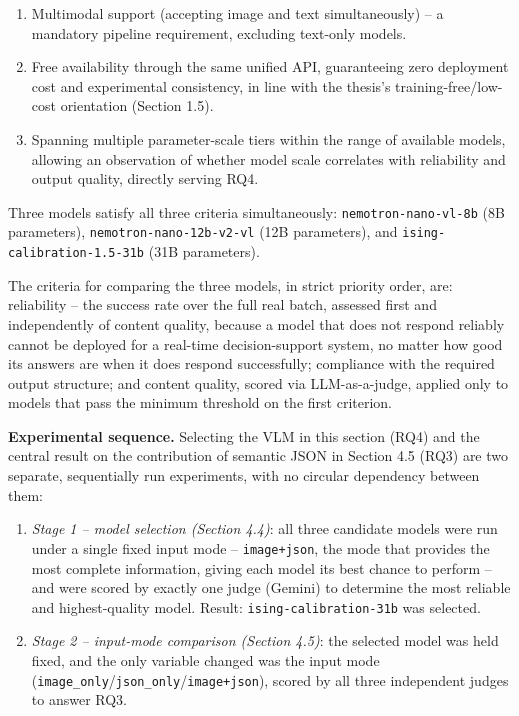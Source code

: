 \documentclass[12pt,a4paper]{report}
\begin{document}
\begin{enumerate}
    \item Multimodal support (accepting image and text simultaneously) -- a mandatory pipeline requirement, excluding text-only models.
    \item Free availability through the same unified API, guaranteeing zero deployment cost and experimental consistency, in line with the thesis's training-free/low-cost orientation (Section 1.5).
    \item Spanning multiple parameter-scale tiers within the range of available models, allowing an observation of whether model scale correlates with reliability and output quality, directly serving RQ4.
\end{enumerate}

Three models satisfy all three criteria simultaneously: \texttt{nemotron-nano-vl-8b} (8B parameters), \texttt{nemotron-nano-12b-v2-vl} (12B parameters), and \texttt{ising-calibration-1.5-31b} (31B parameters).

The criteria for comparing the three models, in strict priority order, are: reliability -- the success rate over the full real batch, assessed first and independently of content quality, because a model that does not respond reliably cannot be deployed for a real-time decision-support system, no matter how good its answers are when it does respond successfully; compliance with the required output structure; and content quality, scored via LLM-as-a-judge, applied only to models that pass the minimum threshold on the first criterion.

\textbf{Experimental sequence.} Selecting the VLM in this section (RQ4) and the central result on the contribution of semantic JSON in Section 4.5 (RQ3) are two separate, sequentially run experiments, with no circular dependency between them:

\begin{enumerate}
    \item \textit{Stage 1 -- model selection (Section 4.4)}: all three candidate models were run under a single fixed input mode -- \texttt{image+json}, the mode that provides the most complete information, giving each model its best chance to perform -- and were scored by exactly one judge (Gemini) to determine the most reliable and highest-quality model. Result: \texttt{ising-calibration-31b} was selected.
    \item \textit{Stage 2 -- input-mode comparison (Section 4.5)}: the selected model was held fixed, and the only variable changed was the input mode (\texttt{image\_only}/\texttt{json\_only}/\texttt{image+json}), scored by all three independent judges to answer RQ3.
\end{enumerate}
\end{document}
